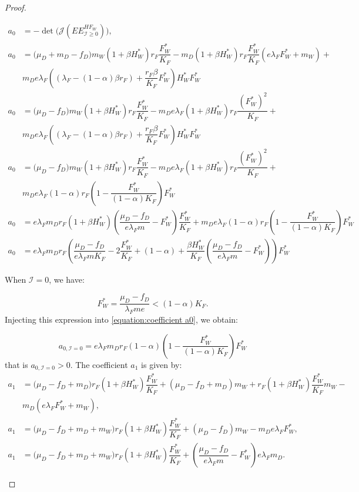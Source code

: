 \documentclass{article}
\newcommand{\lfw}{\lambda_{F}}
\newcommand{\lfw}{\lambda_{F}}
\newcommand{\cI}{\mathcal{I}}
\begin{document}
\begin{proof}
\begin{itemize}
\begin{subequations}
\begin{align}
a_0 &= -\det\Big(\mathcal{J}(EE^{H F_W}_{\cI \geq 0})\Big), \\
a_0 &= \Big(\mu_D + m_D -f_D \Big) m_W (1+\beta H_W^*) r_F \dfrac{F^*_W}{K_F}  - m_D (1 + \beta H_W^*) r_F \dfrac{F_W^*}{K_F}(e\lfw F_W^* + m_W) + \\
\nonumber
&  m_D e \lfw  \left((\lfw - (1-\alpha)\beta r_F)  + \dfrac{r_F\beta}{K_F} F_W^* \right)H_W^* F_W^* \\
a_0 &= \Big(\mu_D -f_D \Big) m_W (1+\beta H_W^*) r_F \dfrac{F^*_W}{K_F}  - m_D e\lfw (1 + \beta H_W^*) r_F \dfrac{(F_W^*)^2}{K_F} + \\
\nonumber
&  m_D e \lfw \left((\lfw - (1-\alpha)\beta r_F)  + \dfrac{r_F\beta}{K_F} F_W^* \right)H_W^*F_W^* \\
a_0 &= \Big(\mu_D -f_D \Big) m_W (1+\beta H_W^*) r_F \dfrac{F^*_W}{K_F}  - m_D e\lfw (1 + \beta H_W^*) r_F \dfrac{(F_W^*)^2}{K_F} + \\
\nonumber
&  m_D e \lfw (1- \alpha) r_F \left(1 - \dfrac{F_W^*}{(1- \alpha)K_F}\right) F_W^* \\
a_0 &= e \lfw m_D r_F (1 + \beta H_W^*) \left(\dfrac{\mu_D -f_D }{e \lfw m} - F_W^*\right) \dfrac{F_W^*}{K_F} + m_D e \lfw (1- \alpha) r_F \left(1 - \dfrac{F_W^*}{(1- \alpha)K_F}\right) F_W^*  \\
a_0 &= e \lfw m_D r_F \left(\dfrac{\mu_D -f_D }{e \lfw m K_F} - 2\dfrac{F_W^*}{K_F} + (1-\alpha) + \dfrac{\beta H_W^*}{K_F} \left(\dfrac{\mu_D -f_D }{e \lfw m} - F_W^*\right) \right) F_W^*   \label{equation:coefficient a0}
\end{align}
\end{subequations}

When $\cI = 0$, we have:

\begin{equation*}
F_W^* = \dfrac{\mu_D - f_D}{\lfw m e} < (1-\alpha)K_F.
\end{equation*} 
Injecting this expression into \eqref{equation:coefficient a0}, we obtain:

\begin{equation*}
a_{0, \cI=0} = e \lfw m_D r_F  (1- \alpha) \left(1 - \dfrac{F_W^*}{(1- \alpha)K_F}\right) F_W^* 
\end{equation*}
that is $a_{0, \cI=0}>0$. The coefficient $a_1$ is given by:
\begin{subequations}
\begin{align}
a_1 &= \big( \mu_D  -f_D + m_D) r_F(1+ \beta H_W^*) \dfrac{F^*_W}{K_F} + (\mu_D -f_D + m_D) m_W + r_F(1+ \beta H_W^*) \dfrac{F_W^*}{K_F} m_W - \\ \nonumber &m_D (e\lfw F^*_W + m_W), \\
a_1 &= \big( \mu_D  -f_D + m_D + m_W) r_F(1+ \beta H_W^*) \dfrac{F^*_W}{K_F} + (\mu_D -f_D) m_W  - m_D e\lfw F^*_W, \\
a_1 &= \big( \mu_D  -f_D + m_D + m_W) r_F(1+ \beta H_W^*) \dfrac{F^*_W}{K_F} + \left(\dfrac{\mu_D -f_D}{e\lfw m} - F_W^*\right) e \lfw m_D . \label{equation:coefficient a1}
\end{align}
\end{subequations}


\end{itemize}
\end{proof}
\end{document}
